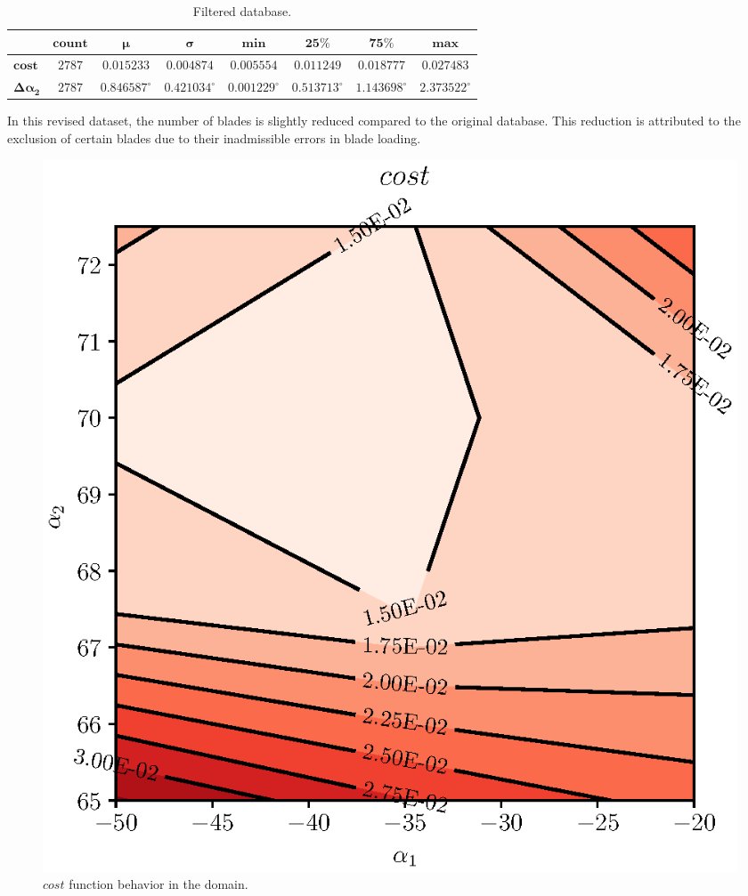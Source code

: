 \begin{table}[H]  
    \centering
    \renewcommand{\arraystretch}{2}
    \caption{Filtered database.}
    \label{tab:filteredDatabase}
    \begin{tabular}{| l c c c c c c c |}
        \hline
                                       & $\boldsymbol{count}$ & $\boldsymbol{\mu}$ & $\boldsymbol{\sigma}$ & $\boldsymbol{min}$ & $\boldsymbol{25\%}$ & $\boldsymbol{75\%}$ & $\boldsymbol{max}$ \\ \hline\hline
        $\boldsymbol{cost}$            & $2787$               & $0.015233$         & $0.004874$            & $0.005554$         & $0.011249$          & $0.018777$          & $0.027483$         \\ \hline
        $\boldsymbol{\Delta \alpha_2}$ & $2787$               & $0.846587^\circ$   & $0.421034^\circ$      & $0.001229^\circ$   & $0.513713^\circ$    & $1.143698^\circ$    & $2.373522^\circ$   \\ \hline
    \end{tabular}
\end{table} 

In this revised dataset, the number of blades is slightly reduced compared to the original database. This reduction is attributed to the exclusion of certain blades due to their inadmissible errors in blade loading.

\begin{figure}[H]
    \centering
    \includegraphics[scale=\scaleContour]{./images/cost.eps}
    \caption{$cost$ function behavior in the domain.}
    \label{fig:cost}
\end{figure}


